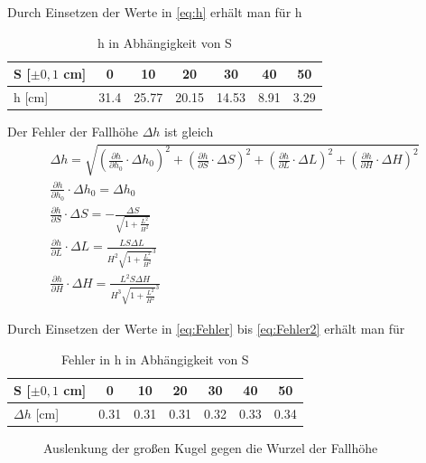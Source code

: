Durch Einsetzen der Werte in \ref{eq:h} erhält man für h
\begin{table}[H]
  \centering
  \begin{tabular}{l | c | c | c | c | c | c}
    S [$\pm 0,1$ cm]  & \num{0} & \num{10} & \num{20} & \num{30} & \num{40} & \num{50}\\ \hline
    h [cm] & \num{31,4} & \num{25,77} & \num{20,15} & \num{14,53} & \num{8,91} & \num{3,29} \\
    
  \end{tabular}
  \caption{h in Abhängigkeit von S}
  \label{tab:hvons}
\end{table}
Der Fehler der Fallhöhe $\Delta h$ ist gleich
\begin{gather}\label{eq:Fehler}
\Delta h= \sqrt{(\frac{\partial h}{\partial h_0}\cdot\Delta h_0)^2+(\frac{\partial h}{\partial S}\cdot\Delta S)^2+(\frac{\partial h}{\partial L}\cdot\Delta L)^2+(\frac{\partial h}{\partial H}\cdot\Delta H)^2}\\
\frac{\partial h}{\partial h_0}\cdot\Delta h_0= \Delta h_0 \\
\frac{\partial h}{\partial S}\cdot\Delta S =-\frac{\Delta S}{\sqrt{1+\frac{L^2}{H^2}}}\\
\frac{\partial h}{\partial L}\cdot\Delta L = \frac{LS\Delta L}{H^2\sqrt{1+\frac{L^2}{H^2}}^3}\\
\label{eq:Fehler2}\frac{\partial h}{\partial H}\cdot\Delta H = \frac{L^2S\Delta H}{H^3\sqrt{1+\frac{L^2}{H^2}}^3}
\end{gather}

Durch Einsetzen der Werte in \ref{eq:Fehler} bis \ref{eq:Fehler2} erhält man für
\begin{table}[H]
  \centering
  \begin{tabular}{l | c | c | c | c | c | c}
    S [$\pm 0,1$ cm]  & \num{0} & \num{10} & \num{20} & \num{30} & \num{40} & \num{50}\\ \hline
  $\Delta h $ [cm] & \num{0,31} & \num{0,31} & \num{0,31} & \num{0,32} & \num{0,33} & \num{0,34} \\
    
  \end{tabular}
  \caption{Fehler in h in Abhängigkeit von S}
  \label{tab:fehlerh}
\end{table}

\begin{figure}[H]
  \centering
  \caption{Auslenkung der großen Kugel gegen die Wurzel der Fallhöhe}
  \label{fig:auslenkung}
\end{figure}


